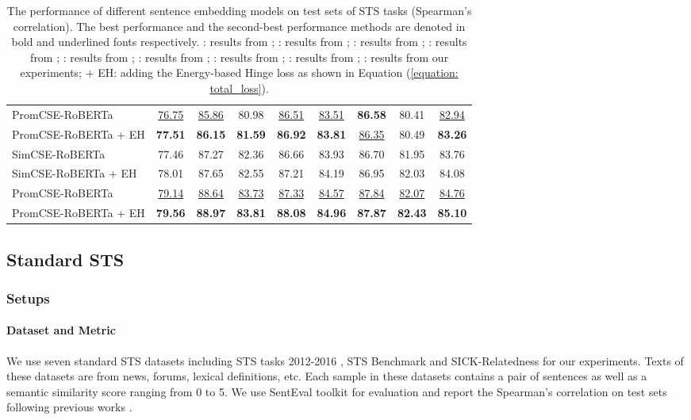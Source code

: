 \documentclass[11pt]{article}
\begin{document}
\begin{table*}[!t]
\begin{tabular}{lcccccccc}
 PromCSE-RoBERTa                & \underline{76.75} & \underline{85.86} & 80.98 & \underline{86.51} & \underline{83.51} & \textbf{86.58} & 80.41  & \underline{82.94} \\
 PromCSE-RoBERTa + EH  & \textbf{77.51} & \textbf{86.15} & \textbf{81.59} & \textbf{86.92} & \textbf{83.81} & \underline{86.35} & 80.49  & \textbf{83.26} \\
\midrule
SimCSE-RoBERTa                  & 77.46 & 87.27 & 82.36 & 86.66 & 83.93 & 86.70  & 81.95  & 83.76 \\
 SimCSE-RoBERTa + EH  & 78.01 & 87.65 & 82.55 & 87.21 & 84.19 & 86.95 & 82.03  & 84.08 \\
 PromCSE-RoBERTa               & \underline{79.14} & \underline{88.64} & \underline{83.73} & \underline{87.33} & \underline{84.57} & \underline{87.84} & \underline{82.07}  & \underline{84.76} \\
 PromCSE-RoBERTa + EH & \textbf{79.56} & \textbf{88.97} & \textbf{83.81} & \textbf{88.08} & \textbf{84.96} & \textbf{87.87} & \textbf{82.43}  & \textbf{85.10} \\
\bottomrule
\end{tabular}
\caption{\label{tab: standard sts}
The performance of different sentence embedding models on test sets of STS tasks (Spearman’s correlation). The best performance and the second-best performance methods are denoted in bold and underlined fonts respectively. : results from \cite{ReimersG19sbert}; : results from \cite{gao2021simcse}; : results from \cite{zhang-etal-2020-isbert}; : results from \cite{Yan2021consert}; : results from \cite{liu2021mirrorbert}; : results from \cite{kim2021sgopt}; : results from \cite{chuang2022diffcse}; : results from \cite{2022promptbert};  : results from our experiments; + EH: adding the Energy-based Hinge loss as shown in Equation (\ref{equation: total_loss}).
}
\end{table*}

\subsection{Standard STS}
\label{sec: standard sts}
\subsubsection{Setups}
\paragraph{Dataset and Metric}
We use seven standard STS datasets including STS tasks 2012-2016 \cite{sts12, sts13, sts14, sts15, sts16}, STS Benchmark \cite{stsb} and SICK-Relatedness \cite{sickr} for our experiments. Texts of these datasets are from news, forums, lexical definitions, etc. Each sample in these datasets contains a pair of sentences as well as a semantic similarity score ranging from 0 to 5. We use SentEval toolkit \cite{ConneauK18senteval} for evaluation and report the Spearman’s correlation on test sets following previous works \cite{ReimersG19sbert, gao2021simcse}.
\end{document}
